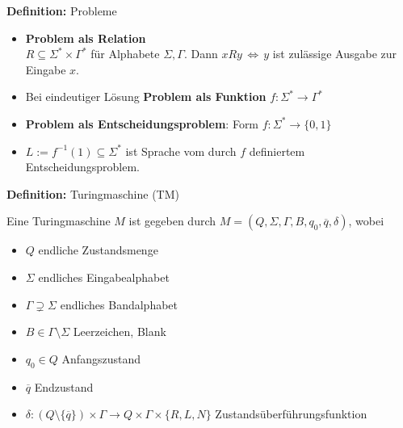 \documentclass[a4paper,graphics,11pt]{article}
\newcommand{\Iff}[0]{\,\Longleftrightarrow\,}
\begin{document}
\textbf{Definition:} Probleme
\begin{itemize}
    \item \textbf{Problem als Relation}\\
        $R \subseteq \Sigma^* \times \Gamma^*$ für Alphabete $\Sigma, \Gamma$.
        Dann $x R y\Iff y$ ist zulässige Ausgabe zur Eingabe $x$.
    \item Bei eindeutiger Lösung \textbf{Problem als Funktion} $f: \Sigma^* \to \Gamma^*$
    \item \textbf{Problem als Entscheidungsproblem}: Form $f : \Sigma^* \to \{0,1\}$
    \item $L := f^{-1}(1) \subseteq \Sigma^*$ ist Sprache vom durch $f$ definiertem Entscheidungsproblem.
\end{itemize}

\strut

\textbf{Definition:} Turingmaschine (TM)

Eine Turingmaschine $M$ ist gegeben durch $M = (Q, \Sigma, \Gamma, B, q_0, \overline{q}, \delta)$, wobei
\begin{itemize}
    \item $Q$ endliche Zustandsmenge
    \item $\Sigma$ endliches Eingabealphabet
    \item $\Gamma \supsetneq \Sigma$ endliches Bandalphabet
    \item $B \in \Gamma \setminus \Sigma$ Leerzeichen, Blank
    \item $q_0 \in Q$ Anfangszustand
    \item $\overline{q}$ Endzustand
    \item $\delta : (Q \setminus \{\overline{q}\}) \times \Gamma \to Q \times \Gamma \times \{R, L, N\}$
        Zustandsüberführungsfunktion
\end{itemize}
\end{document}
